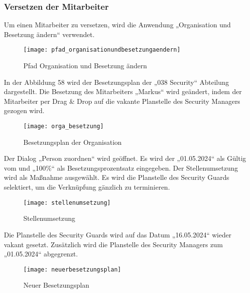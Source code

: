 \subsubsection{Versetzen der Mitarbeiter}
Um einen Mitarbeiter zu versetzen, wird die Anwendung „Organisation und Besetzung ändern“ verwendet.
\begin{figure}[H]
	\centering
	\texttt{[image: pfad\_organisationundbesetzungaendern]}
	\caption{Pfad Organisation und Besetzung ändern}
	\label{fig:pfad_organisationundbesetzungaendern}
\end{figure}
In der Abbildung 58 wird der Besetzungsplan der „038 Security“ Abteilung dargestellt. Die Besetzung des Mitarbeiters „Markus“ wird geändert, indem der Mitarbeiter per Drag \& Drop auf die vakante Planstelle des Security Managers gezogen wird.
\begin{figure}[H]
	\centering
	\texttt{[image: orga\_besetzung]}
	\caption{Besetzungsplan der Organisation}
	\label{fig:orga_besetzung}
\end{figure}
Der Dialog „Person zuordnen“ wird geöffnet. Es wird der „01.05.2024“ als Gültig vom und „100\%“ als Besetzungsprozentsatz eingegeben. Der Stellenumsetzung wird als Maßnahme ausgewählt. Es wird die Planstelle des Security Guards selektiert, um die Verknüpfung gänzlich zu terminieren.
\begin{figure}[H]
	\centering
	\texttt{[image: stellenumsetzung]}
	\caption{Stellenumsetzung}
	\label{fig:stellenumsetzung}
\end{figure}
Die Planstelle des Security Guards wird auf das Datum „16.05.2024“ wieder vakant gesetzt. Zusätzlich wird die Planstelle des Security Managers zum „01.05.2024“ abgegrenzt.
\begin{figure}[H]
	\centering
	\texttt{[image: neuerbesetzungsplan]}
	\caption{Neuer Besetzungsplan}
	\label{fig:neuerbesetzungsplan}
\end{figure}
\clearpage
